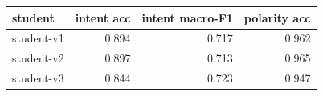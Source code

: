 \begin{tabular}{lrrr}
\toprule
student & intent acc & intent macro-F1 & polarity acc \\
\midrule
student-v1 & 0.894 & 0.717 & 0.962 \\
student-v2 & 0.897 & 0.713 & 0.965 \\
student-v3 & 0.844 & 0.723 & 0.947 \\
\bottomrule
\end{tabular}
